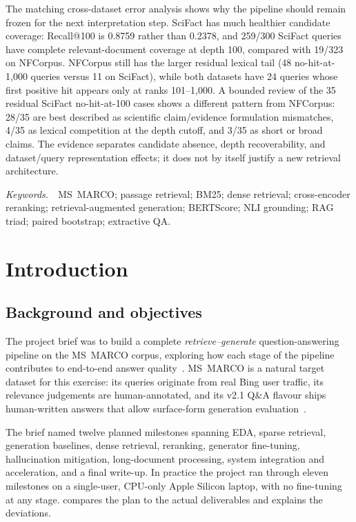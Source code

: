 \documentclass[11pt,a4paper]{article}
\makeatletter
\newcommand{\msmarco}{MS~MARCO}
\newcommand{\bertscore}{BERTScore}
\newcommand{\recallH}{Recall@100}
\newcommand{\bmtwofive}{BM25}
\makeatother
\begin{document}
The matching cross-dataset error analysis shows why the pipeline should
remain frozen for the next interpretation step.  SciFact has much
healthier candidate coverage: \recallH{} is 0.8759 rather than 0.2378,
and 259/300 SciFact queries have complete relevant-document coverage at
depth 100, compared with 19/323 on NFCorpus.  NFCorpus still has the
larger residual lexical tail (48 no-hit-at-1,000 queries versus 11 on
SciFact), while both datasets have 24 queries whose first positive hit
appears only at ranks 101--1,000.  A bounded review of the 35 residual
SciFact no-hit-at-100 cases shows a different pattern from NFCorpus:
28/35 are best described as scientific claim/evidence formulation
mismatches, 4/35 as lexical competition at the depth cutoff, and 3/35
as short or broad claims.  The evidence separates candidate absence,
depth recoverability, and dataset/query representation effects; it
does not by itself justify a new retrieval architecture.

\vspace{2em}
\noindent\textit{Keywords.}~~MS~MARCO; passage retrieval; \bmtwofive{};
dense retrieval; cross-encoder reranking; retrieval-augmented
generation; \bertscore{}; NLI grounding; RAG triad; paired bootstrap;
extractive QA.

\newpage
\tableofcontents
\clearpage
\listoftables
\listoffigures
\clearpage

\clearpage\section{Introduction}
\label{sec:intro}

\subsection{Background and objectives}

The project brief was to build a complete
\emph{retrieve--generate} question-answering pipeline on the
\msmarco{} corpus, exploring how each stage of the pipeline
contributes to end-to-end answer quality~\cite{bajaj2016msmarco,lewis2020rag}.
\msmarco{} is a natural target dataset for this exercise: its
queries originate from real Bing user traffic, its
relevance judgements are human-annotated, and its v2.1 Q\&A flavour
ships human-written answers that allow surface-form generation
evaluation~\cite{nguyen2016msmarcoqa}.

The brief named twelve planned milestones spanning EDA, sparse
retrieval, generation baselines, dense retrieval, reranking,
generator fine-tuning, hallucination mitigation, long-document
processing, system integration and acceleration, and a final
write-up.  In practice the project ran through eleven milestones on a
single-user, CPU-only Apple Silicon laptop, with no fine-tuning at
any stage.   compares the plan to the actual
deliverables and explains the deviations.
\end{document}
